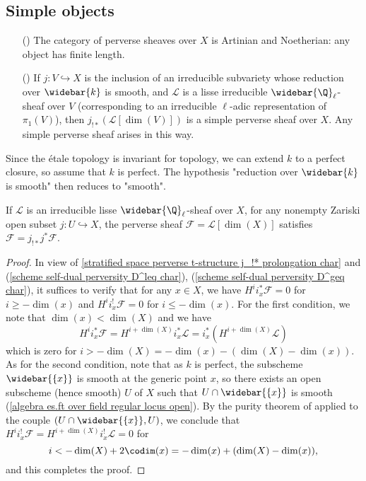 \subsection{Simple objects}
\begin{theorem}
\label{scheme perverse simple char}
\mbox{}
\begin{enumerate}
    \item[(\rmnum{1})] The category of perverse sheaves over $X$ is Artinian and Noetherian: any object has finite length.
    \item[(\rmnum{2})] If $j:V\hookrightarrow X$ is the inclusion of an irreducible subvariety whose reduction over $\widebar{k}$ is smooth, and $\mathscr{L}$ is a lisse irreducible $\widebar{\Q}_\ell$-sheaf over $V$ (corresponding to an irreducible $\ell$-adic representation of $\pi_1(V)$), then $j_{!*}(\mathscr{L}[\dim(V)])$ is a simple perverse sheaf over $X$. Any simple perverse sheaf arises in this way.
\end{enumerate}
\end{theorem}

Since the \'etale topology is invariant for topology, we can extend $k$ to a perfect closure, so assume that $k$ is perfect. The hypothesis "reduction over $\widebar{k}$ is smooth" then reduces to "smooth".

\begin{lemma}\label{scheme perverse irreducible lisse extension from open prop}
If $\mathscr{L}$ is an irreducible lisse $\widebar{\Q}_\ell$-sheaf over $X$, for any nonempty Zariski open subset $j:U\hookrightarrow X$, the perverse sheaf $\mathscr{F}=\mathscr{L}[\dim(X)]$ satisfies $\mathscr{F}=j_{!*}j^*\mathscr{F}$.
\end{lemma}
\begin{proof}
In view of \cref{stratified space perverse t-structure j_!* prolongation char} and (\ref{scheme self-dual perversity D^leq char}), (\ref{scheme self-dual perversity D^geq char}), it suffices to verify that for any $x\in X$, we have $H^ii_x^*\mathscr{F}=0$ for $i\geq-\dim(x)$ and $H^ii_x^!\mathscr{F}=0$ for $i\leq-\dim(x)$. For the first condition, we note that $\dim(x)<\dim(X)$ and we have
\[H^ii_x^*\mathscr{F}=H^{i+\dim(X)}i_x^*\mathscr{L}=i_x^*(H^{i+\dim(X)}\mathscr{L})\]
which is zero for $i>-\dim(X)=-\dim(x)-(\dim(X)-\dim(x))$. As for the second condition, note that as $k$ is perfect, the subscheme $\widebar{\{x\}}$ is smooth at the generic point $x$, so there exists an open subscheme (hence smooth) $U$ of $X$ such that $U\cap\widebar{\{x\}}$ is smooth (\cref{algebra es.ft over field regular locus open}). By the purity theorem of \autocite[XVI, 3.7]{SGA4-3} applied to the couple $(U\cap\widebar{\{x\}},U)$, we conclude that $H^ii_x^!\mathscr{F}=H^{i+\dim(X)}i_x^!\mathscr{L}=0$ for
\[i<-\dim(X)+2\codim(x)=-\dim(x)+(\dim(X)-\dim(x)),\]
and this completes the proof.
\end{proof}

